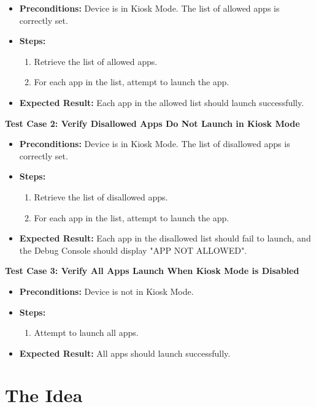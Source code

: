   \begin{itemize}
    \item \textbf{Preconditions:} Device is in Kiosk Mode. The list of allowed apps is correctly set.
    \item \textbf{Steps:}
    \begin{enumerate}
      \item Retrieve the list of allowed apps.
      \item For each app in the list, attempt to launch the app.
    \end{enumerate}
    \item \textbf{Expected Result:} Each app in the allowed list should launch successfully.
  \end{itemize}

  \textbf{Test Case 2: Verify Disallowed Apps Do Not Launch in Kiosk Mode}

  \begin{itemize}
    \item \textbf{Preconditions:} Device is in Kiosk Mode. The list of disallowed apps is correctly set.
    \item \textbf{Steps:}
    \begin{enumerate}
      \item Retrieve the list of disallowed apps.
      \item For each app in the list, attempt to launch the app.
    \end{enumerate}
    \item \textbf{Expected Result:} Each app in the disallowed list should fail to launch, and the Debug Console should display "APP NOT ALLOWED".
  \end{itemize}

  \textbf{Test Case 3: Verify All Apps Launch When Kiosk Mode is Disabled}

  \begin{itemize}
    \item \textbf{Preconditions:} Device is not in Kiosk Mode.
    \item \textbf{Steps:}
    \begin{enumerate}
      \item Attempt to launch all apps.
    \end{enumerate}
    \item \textbf{Expected Result:} All apps should launch successfully.
  \end{itemize}

  \clearpage
  \section{The Idea}

